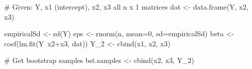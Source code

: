  \begin{code}
  # Given: Y, x1 (intercept), x2, x3 all n x 1 matrices
  dat <- data.frame(Y, x2, x3)
  
  empiricalSd <- sd(Y)
  eps <- rnorm(n, mean=0, sd=empiricalSd)
  beta <- coef(lm.fit(Y~x2+x3, dat))
  Y_2 <- cbind(x1, x2, x3) %
  
  # Get bootstrap samples
  bst.samples <- cbind(x2, x3, Y_2)
 \end{code}
